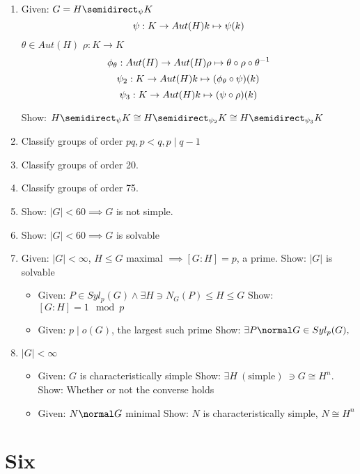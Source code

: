 \begin{enumerate}
\def\labelenumi{\arabic{enumi}.}
\item
  Given: $G = H \semidirect_\psi K$
  $$\psi: K \rightarrow Aut(H) \\ k \mapsto \psi(k)$$
  $\theta \in Aut(H)$ $\rho: K \rightarrow K$
  $$\phi_\theta: Aut(H) \rightarrow Aut(H) \\ \rho \mapsto \theta \circ \rho \circ \theta^{-1}$$
  $$\psi_2: K \rightarrow Aut(H) \\ k \mapsto (\phi_\theta \circ \psi)(k)$$
  $$\psi_3: K \rightarrow Aut(H) \\ k \mapsto (\psi \circ \rho)(k)$$

  Show:
  $H \semidirect_\psi K \cong H \semidirect_{\psi_2} K \cong H \semidirect_{\psi_3} K$
\item
  Classify groups of order $pq, p < q, p \mid q-1$
\item
  Classify groups of order 20.
\item
  Classify groups of order 75.
\item
  Show: $|G| < 60 \implies G$ is not simple.
\item
  Show: $|G| < 60 \implies G$ is solvable
\item
  Given: $|G| < \infty$, $H \leq G$ maximal $\implies [G:H] = p$, a
  prime. Show: $|G|$ is solvable

  \begin{itemize}
  \tightlist
  \item
    Given: $P \in Syl_p(G) \wedge \exists H \ni N_G(P) \leq H \leq G$
    Show: $[G:H] = 1 \mod p$
  \item
    Given: $p \mid o(G)$, the largest such prime Show:
    $\exists P \normal G \in Syl_p(G),$
  \end{itemize}
\item
  $|G| < \infty$

  \begin{itemize}
  \tightlist
  \item
    Given: $G$ is characteristically simple Show:
    $\exists H~(\text{simple})~ \ni G \cong H^n$. Show: Whether or not
    the converse holds
  \item
    Given: $N \normal G$ minimal Show: $N$ is characteristically simple,
    $N \cong H^n$
  \end{itemize}
\end{enumerate}

\hypertarget{six}{%
\section{Six}\label{six}}

